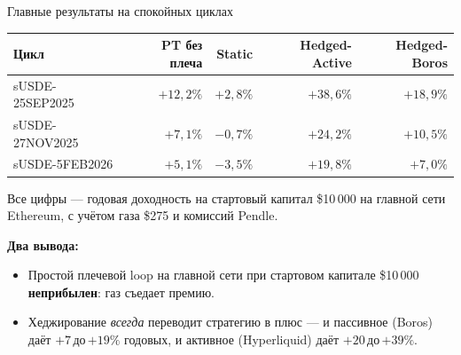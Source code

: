\documentclass[11pt,aspectratio=169]{beamer}
\begin{document}
\begin{frame}{Главные результаты на спокойных циклах}
  \footnotesize
  \begin{tabular}{lrrrr}
    \toprule
    Цикл & PT без плеча & Static & Hedged-Active & Hedged-Boros \\
    \midrule
    sUSDE-25SEP2025 & $+12{,}2\%$ & \textcolor{bad}{$+2{,}8\%$}  & \textcolor{good}{$+38{,}6\%$} & $+18{,}9\%$ \\
    sUSDE-27NOV2025 &  $+7{,}1\%$ & \textcolor{bad}{$-0{,}7\%$} & \textcolor{good}{$+24{,}2\%$} & $+10{,}5\%$ \\
    sUSDE-5FEB2026  &  $+5{,}1\%$ & \textcolor{bad}{$-3{,}5\%$} & \textcolor{good}{$+19{,}8\%$} &  $+7{,}0\%$ \\
    \bottomrule
  \end{tabular}

  \vspace{0.7em}
  \normalsize
  Все цифры --- годовая доходность на стартовый капитал \$10\,000 на главной
  сети Ethereum, с учётом газа \$275 и комиссий Pendle.

  \vspace{0.4em}
  \textbf{Два вывода:}
  \begin{itemize}\itemsep0.2em
    \item Простой плечевой loop на главной сети при стартовом капитале
          \$10\,000 \textbf{неприбылен}: газ съедает премию.
    \item Хеджирование \emph{всегда} переводит стратегию в плюс ---
          и пассивное (Boros) даёт $+7$\,до\,$+19\%$ годовых, и активное
          (Hyperliquid) даёт $+20$\,до\,$+39\%$.
  \end{itemize}
\end{frame}
\end{document}
